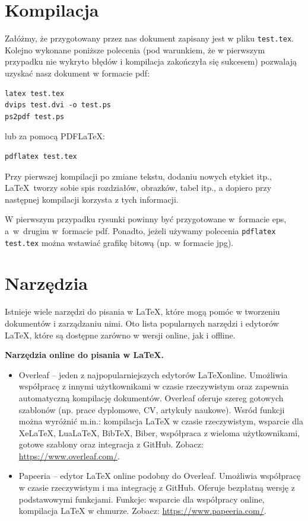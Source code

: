 \section{Kompilacja}
\label{sec:kompilacja}


Załóżmy, że przygotowany przez nas dokument zapisany jest w pliku \texttt{test.tex}. Kolejno wykonane poniższe polecenia (pod warunkiem, że w pierwszym przypadku nie wykryto błędów i kompilacja zakończyła się sukcesem) pozwalają uzyskać nasz dokument w formacie pdf:
\begin{lstlisting}
latex test.tex
dvips test.dvi -o test.ps
ps2pdf test.ps
\end{lstlisting}
%
lub za pomocą PDF\LaTeX:
\begin{lstlisting}
pdflatex test.tex
\end{lstlisting}

Przy pierwszej kompilacji po zmiane tekstu, dodaniu nowych etykiet itp., \LaTeX~tworzy sobie spis rozdziałów, obrazków, tabel itp., a dopiero przy następnej kompilacji korzysta z tych informacji.

W pierwszym przypadku rysunki powinny być przygotowane w~formacie eps, a~w~drugim w~formacie pdf. Ponadto, jeżeli używamy polecenia \texttt{pdflatex test.tex} można wstawiać grafikę bitową (np. w formacie jpg).




\section{Narzędzia}
\label{sec:narzedzia}

Istnieje wiele narzędzi do pisania w LaTeX, które mogą pomóc w tworzeniu dokumentów i zarządzaniu nimi. Oto lista popularnych narzędzi i edytorów \LaTeX, które są dostępne zarówno w wersji online, jak i offline.

\noindent \textbf{Narzędzia online do pisania w LaTeX.}
\begin{itemize}
      \item Overleaf -- jeden z najpopularniejszych edytorów \LaTeX online. Umożliwia współpracę z innymi użytkownikami w czasie rzeczywistym oraz zapewnia automatyczną kompilację dokumentów. Overleaf oferuje szereg gotowych szablonów (np. prace dyplomowe, CV, artykuły naukowe). Wsród funkcji można wyróżnić m.in.: kompilacja LaTeX w czasie rzeczywistym, wsparcie dla XeLaTeX, LuaLaTeX, BibTeX, Biber, współpraca z wieloma użytkownikami, gotowe szablony oraz integracja z GitHub. Zobacz: \url{https://www.overleaf.com/}.
      \item Papeeria -- edytor LaTeX online podobny do Overleaf. Umożliwia współpracę w czasie rzeczywistym i ma integrację z GitHub. Oferuje bezpłatną wersję z podstawowymi funkcjami. Funkcje: wsparcie dla współpracy online, kompilacja LaTeX w chmurze. Zobacz: \url{https://www.papeeria.com/}.
\end{itemize}

